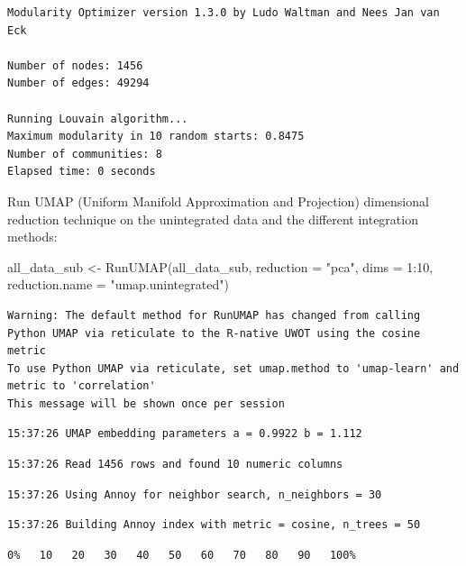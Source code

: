 \documentclass[
  letterpaper,
  DIV=11,
  numbers=noendperiod]{scrreprt}
\newenvironment{Shaded}{\begin{snugshade}}{\end{snugshade}}
\newcommand{\AttributeTok}[1]{\textcolor[rgb]{0.40,0.45,0.13}{#1}}
\newcommand{\DecValTok}[1]{\textcolor[rgb]{0.68,0.00,0.00}{#1}}
\newcommand{\FunctionTok}[1]{\textcolor[rgb]{0.28,0.35,0.67}{#1}}
\newcommand{\NormalTok}[1]{\textcolor[rgb]{0.00,0.23,0.31}{#1}}
\newcommand{\OtherTok}[1]{\textcolor[rgb]{0.00,0.23,0.31}{#1}}
\newcommand{\SpecialCharTok}[1]{\textcolor[rgb]{0.37,0.37,0.37}{#1}}
\newcommand{\StringTok}[1]{\textcolor[rgb]{0.13,0.47,0.30}{#1}}
\begin{document}
\begin{verbatim}
Modularity Optimizer version 1.3.0 by Ludo Waltman and Nees Jan van Eck

Number of nodes: 1456
Number of edges: 49294

Running Louvain algorithm...
Maximum modularity in 10 random starts: 0.8475
Number of communities: 8
Elapsed time: 0 seconds
\end{verbatim}

Run UMAP (Uniform Manifold Approximation and Projection) dimensional
reduction technique on the unintegrated data and the different
integration methods:

\begin{Shaded}
\begin{Highlighting}[]
\NormalTok{all\_data\_sub }\OtherTok{\textless{}{-}} \FunctionTok{RunUMAP}\NormalTok{(all\_data\_sub, }\AttributeTok{reduction =} \StringTok{"pca"}\NormalTok{, }\AttributeTok{dims =} \DecValTok{1}\SpecialCharTok{:}\DecValTok{10}\NormalTok{, }\AttributeTok{reduction.name =} \StringTok{"umap.unintegrated"}\NormalTok{)}
\end{Highlighting}
\end{Shaded}

\begin{verbatim}
Warning: The default method for RunUMAP has changed from calling Python UMAP via reticulate to the R-native UWOT using the cosine metric
To use Python UMAP via reticulate, set umap.method to 'umap-learn' and metric to 'correlation'
This message will be shown once per session
\end{verbatim}

\begin{verbatim}
15:37:26 UMAP embedding parameters a = 0.9922 b = 1.112
\end{verbatim}

\begin{verbatim}
15:37:26 Read 1456 rows and found 10 numeric columns
\end{verbatim}

\begin{verbatim}
15:37:26 Using Annoy for neighbor search, n_neighbors = 30
\end{verbatim}

\begin{verbatim}
15:37:26 Building Annoy index with metric = cosine, n_trees = 50
\end{verbatim}

\begin{verbatim}
0%   10   20   30   40   50   60   70   80   90   100%
\end{verbatim}
\end{document}

